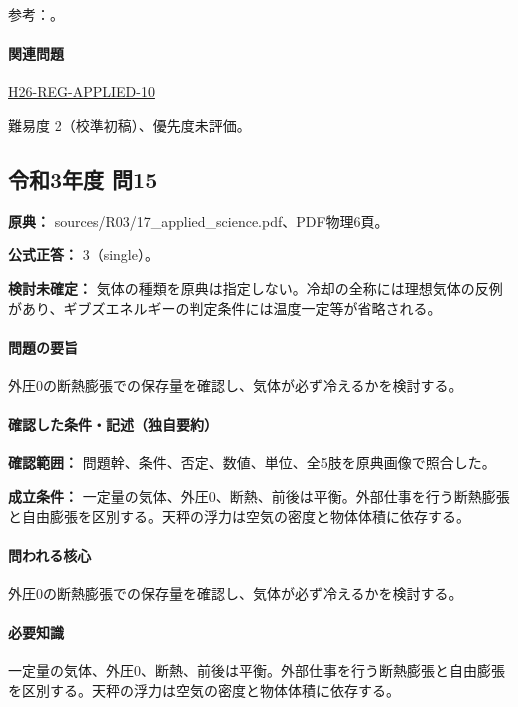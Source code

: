 \par 参考：\cite{iupac_greenbook2012,mit_thermo_firstlaw2008}。

\paragraph{関連問題} \hyperref[q:h26-reg-applied-10]{H26-REG-APPLIED-10}

\par 難易度 2（校準初稿）、優先度未評価。

\subsection{令和3年度 問15}
\label{q:r03-reg-applied-15}

\noindent\textbf{原典：} sources/R03/17\_applied\_science.pdf、PDF物理6頁。

\textbf{公式正答：} 3（single）。

\par\textbf{検討未確定：} 気体の種類を原典は指定しない。冷却の全称には理想気体の反例があり、ギブズエネルギーの判定条件には温度一定等が省略される。

\paragraph{問題の要旨} 外圧0の断熱膨張での保存量を確認し、気体が必ず冷えるかを検討する。

\paragraph{確認した条件・記述（独自要約）}\mbox{}\par

\noindent\textbf{確認範囲：} 問題幹、条件、否定、数値、単位、全5肢を原典画像で照合した。\par

\noindent\textbf{成立条件：} 一定量の気体、外圧0、断熱、前後は平衡。外部仕事を行う断熱膨張と自由膨張を区別する。天秤の浮力は空気の密度と物体体積に依存する。\par

\paragraph{問われる核心} 外圧0の断熱膨張での保存量を確認し、気体が必ず冷えるかを検討する。

\paragraph{必要知識} 一定量の気体、外圧0、断熱、前後は平衡。外部仕事を行う断熱膨張と自由膨張を区別する。天秤の浮力は空気の密度と物体体積に依存する。

